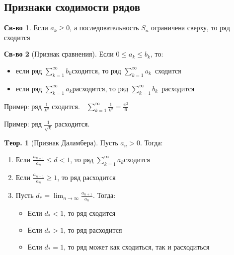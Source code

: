 \documentclass[a4paper,12pt]{article}
\numberwithin{figure}{section}
\theoremstyle{definition}
\newtheorem*{property}{Св-во}  %
\theoremstyle{definition}
\newtheorem{theorem}{Tеор.}[section]
\def\ntoinf{n \to \infty}
\def\leqs{\leqslant}
\def\geqs{\geqslant}
\def\rowak{$\displaystyle\sum_{k=1}^{\infty}a_k$}
\def\rowbk{$\displaystyle\sum_{k=1}^{\infty}b_k$}
\begin{document}
\subsection{Признаки сходимости рядов}

\begin{property}
	Если $a_k \geqs 0$, а последовательность $S_n$ ограничена сверху, то ряд сходится
\end{property}

\begin{property}[Признак сравнения]
	Если $0 \leqs a_k \leqs b_k$, то:
	\begin{itemize}
		\item если ряд \rowbk сходится, то ряд \rowak $\,$ сходится
		\item если ряд \rowak расходится, то ряд \rowbk $\,$ расходится
	\end{itemize}
\end{property}

Пример: ряд $\displaystyle\frac1{k^2}$ сходится. $\;$
$\displaystyle\sum_{k=1}^\infty \frac1{k^2} = \frac{\pi^2}6 $

\bigbreak
Пример: ряд $\displaystyle\frac1{\sqrt{k}}$ расходится.

\begin{theorem}[Признак Даламбера]
  Пусть $a_n > 0$. Тогда:
  \begin{enumerate}
	\item Если $\displaystyle\frac{a_{n+1}}{a_n} \leqs d < 1$, то ряд \rowak сходится
	\item Если $\displaystyle\frac{a_{n+1}}{a_n} \geqs 1$, то ряд расходится
	\item Пусть $\displaystyle d_* = \lim_{\ntoinf} \frac{a_{n+1}}{a_n}$. Тогда:
	  \begin{itemize}
	  	\item Если $d_* < 1$, то ряд сходится
	  	\item Если $d_* > 1$, то ряд расходится
	  	\item Если $d_* = 1$, то ряд может как сходиться, так и расходиться
	  \end{itemize}
  \end{enumerate}
\end{theorem}
\end{document}
